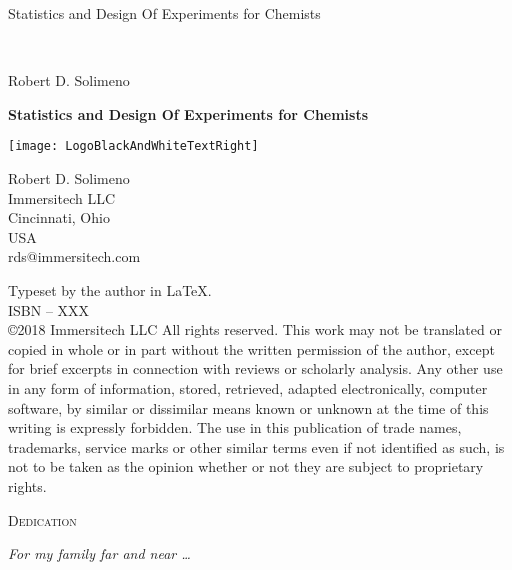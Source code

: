 
\pagestyle{empty}
\vspace*{2in}
\begin{center}
{\Huge Statistics and Design Of Experiments for Chemists }
\end{center}

\newpage

\
\pagestyle{empty}
 
\newpage
\vfill
\begin{flushleft}
	{\LARGE Robert D. Solimeno}
\end{flushleft}
\vfill
\begin{flushleft}
	\fontsize{50}{24.88}\textbf{Statistics and Design Of Experiments for Chemists}
\end{flushleft}
\vfill

\begin{flushleft}
	\texttt{[image: LogoBlackAndWhiteTextRight]}
\end{flushleft}
\newpage

\noindent
Robert D. Solimeno\\
Immersitech LLC\\
Cincinnati, Ohio\\
USA\\
\textsf{rds@immersitech.com}\\

\vfill


Typeset by the author in \LaTeX{.} \\

ISBN -- XXX\\

\copyright 2018 Immersitech LLC
All rights reserved. This work may not be translated or copied in whole or in part without the written permission of the author, except for brief excerpts in connection with reviews or scholarly analysis. Any other use in any form of information, stored, retrieved, adapted electronically, computer software, by similar or dissimilar means known or unknown at the time of this writing is expressly forbidden.  The use in this publication of trade names, trademarks, service marks or other similar terms even if not identified as such, is not to be taken as the opinion whether or not they are subject to proprietary rights.
\pagestyle{empty}
\newpage
\begin{center}
\textsc{Dedication}
\end{center}
\vfill
\begin{center}
\textit{For my family far and near \dots}
\end{center}
\pagestyle{empty}
\vfill
\endinput